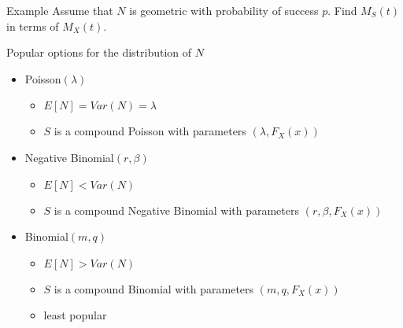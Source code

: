 \documentclass[11pt]{beamer}
\begin{document}
\begin{frame}{Example}
\vspace{- 4 cm}
Assume that $N$ is geometric with probability of success $p$. Find $M_S(t)$ in terms of $M_X(t)$.

\end{frame}
\begin{frame}{Popular options for the distribution of $N$}

\begin{itemize}
\item Poisson$(\lambda)$%
\begin{itemize}
\item $E[N]=Var(N)=\lambda$
\item $S$ is a compound Poisson with parameters $(\lambda,F_X(x))$
\end{itemize}

\vfill

\item Negative Binomial$(r,\beta)$%
\begin{itemize}
\item $E[N]<Var(N)$
\item $S$ is a compound Negative Binomial with parameters $(r,\beta,F_X(x))$
\end{itemize}

\vfill

\item Binomial$(m,q)$%
\begin{itemize}
\item $E[N]>Var(N)$
\item $S$ is a compound Binomial with parameters $(m,q,F_X(x))$
\item least popular
\end{itemize}
\end{itemize}
\end{frame}
\end{document}
